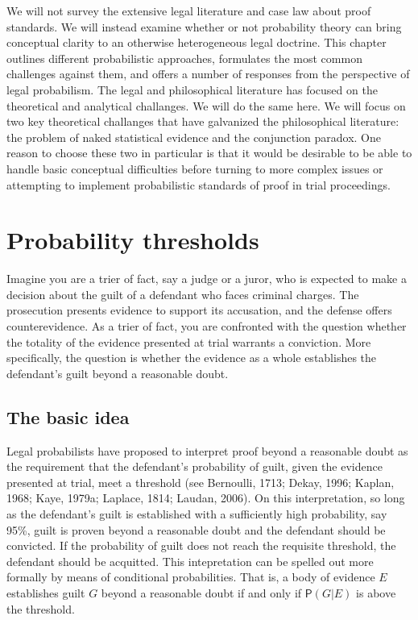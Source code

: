 \documentclass[10pt,dvipsnames,enabledeprecatedfontcommands]{scrartcl}
\newcommand{\pr}[1]{\mathsf{P}(#1)}
\begin{document}

We will not survey the extensive legal literature and case law about
proof standards. We will instead examine whether or not probability
theory can bring conceptual clarity to an otherwise heterogeneous legal
doctrine. This chapter outlines different probabilistic approaches,
formulates the most common challenges against them, and offers a number
of responses from the perspective of legal probabilism. The legal and
philosophical literature has focused on the theoretical and analytical
challanges. We will do the same here. We will focus on two key
theoretical challanges that have galvanized the philosophical
literature: the problem of naked statistical evidence and the
conjunction paradox. One
reason
to choose these two in particular is that it would be desirable to be
able to handle basic conceptual difficulties before turning to more
complex issues or attempting to implement probabilistic standards of
proof in trial proceedings.

\hypertarget{probability-thresholds}{%
\section{Probability thresholds}\label{probability-thresholds}}

Imagine you are a trier of fact, say a judge or a juror, who is expected
to make a decision about the guilt of a defendant who faces criminal
charges. The prosecution presents evidence to support its accusation,
and the defense offers counterevidence. As a trier of fact, you are
confronted with the question whether the totality of the evidence
presented at trial warrants a conviction. More specifically, the
question is whether the evidence as a whole establishes the defendant's
guilt beyond a reasonable doubt.

\hypertarget{the-basic-idea}{%
\subsection{The basic idea}\label{the-basic-idea}}

Legal probabilists have proposed to interpret proof beyond a reasonable
doubt as the requirement that the defendant's probability of guilt,
given the evidence presented at trial, meet a threshold (see Bernoulli,
1713; Dekay, 1996; Kaplan, 1968; Kaye, 1979a; Laplace, 1814; Laudan,
2006). On this interpretation, so long as the defendant's guilt is
established with a sufficiently high probability, say 95\%, guilt is
proven beyond a reasonable doubt and the defendant should be convicted.
If the probability of guilt does not reach the requisite threshold, the
defendant should be acquitted. This intepretation can be spelled out
more formally by means of conditional probabilities. That is, a body of
evidence \(E\) establishes guilt \(G\) beyond a reasonable doubt if and
only if \(\pr{G\vert E}\) is above the threshold.
\end{document}
